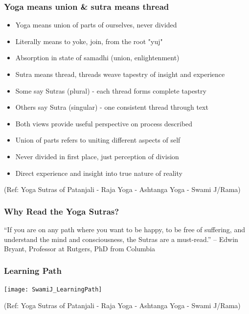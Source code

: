 \begin{frame}[fragile]\frametitle{Yoga means union \& sutra means thread}

\begin{itemize}
\item Yoga means union of parts of ourselves, never divided
\item Literally means to yoke, join, from the root "yuj"
\item Absorption in state of samadhi (union, enlightenment)
\item Sutra means thread, threads weave tapestry of insight and experience
\item Some say Sutras (plural) - each thread forms complete tapestry
\item Others say Sutra (singular) - one consistent thread through text
\item Both views provide useful perspective on process described
\item Union of parts refers to uniting different aspects of self
\item Never divided in first place, just perception of division
\item Direct experience and insight into true nature of reality
\end{itemize}

  
  \tiny{(Ref: Yoga Sutras of Patanjali - Raja Yoga - Ashtanga Yoga - Swami J/Rama)}

\end{frame}

\begin{frame}[fragile]\frametitle{Why Read the Yoga Sutras?}


\begin{center}
{\Large ``If you are on any path where you want to be happy, to be free of suffering, and understand the mind and consciousness, the Sutras are a must-read.''} – Edwin Bryant, Professor at Rutgers, PhD from Columbia
\end{center}

  

\end{frame}

\begin{frame}[fragile]\frametitle{Learning Path}

\begin{center}
\texttt{[image: SwamiJ\_LearningPath]}

\end{center}

  
  \tiny{(Ref: Yoga Sutras of Patanjali - Raja Yoga - Ashtanga Yoga - Swami J/Rama)}

\end{frame}

